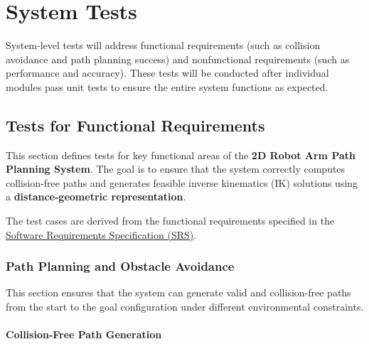\documentclass[12pt, titlepage]{article}
\begin{document}
\section{System Tests}

System-level tests will address functional requirements (such as collision avoidance and path planning success) and nonfunctional requirements (such as performance and accuracy). These tests will be conducted after individual modules pass unit tests to ensure the entire system functions as expected.
\subsection{Tests for Functional Requirements}

This section defines tests for key functional areas of the \textbf{2D Robot Arm Path Planning System}. The goal is to ensure that the system correctly computes collision-free paths and generates feasible inverse kinematics (IK) solutions using a \textbf{distance-geometric representation}. 

The test cases are derived from the functional requirements specified in the \href{https://github.com/FangZiyang/CAS741-Ryan/blob/main/docs/SRS/SRS.pdf}{Software Requirements Specification (SRS)}. 

\subsubsection{Path Planning and Obstacle Avoidance}

This section ensures that the system can generate valid and collision-free paths from the start to the goal configuration under different environmental constraints.

\paragraph{Collision-Free Path Generation}
\end{document}
